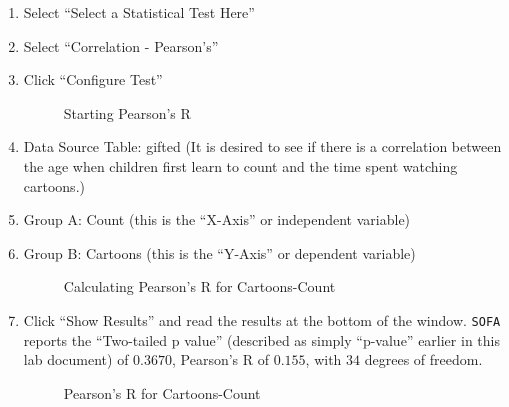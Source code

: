 \begin{enumerate}
  \item Select ``Select a Statistical Test Here''
  \item Select ``Correlation - Pearson's''
  \item Click ``Configure Test''

  \begin{figure}[H]
    \begin{center}
      \caption{Starting Pearson's R}
    \end{center}
  \end{figure}

  \item Data Source Table: gifted (It is desired to see if there is a correlation between the age when children first learn to count and the time spent watching cartoons.)
  \item Group A: Count (this is the ``X-Axis'' or independent variable)
  \item Group B: Cartoons (this is the ``Y-Axis'' or dependent variable)

  \begin{figure}[H]
    \begin{center}
      \caption{Calculating Pearson's R for Cartoons-Count}
    \end{center}
  \end{figure}

  \item Click ``Show Results'' and read the results at the bottom of the window. \texttt{SOFA} reports the ``Two-tailed p value'' (described as simply ``p-value'' earlier in this lab document) of $ 0.3670 $, Pearson's R of $ 0.155 $, with $ 34 $ degrees of freedom.

  \begin{figure}[H]
    \begin{center}
      \caption{Pearson's R for Cartoons-Count}
    \end{center}
  \end{figure}


\end{enumerate}
